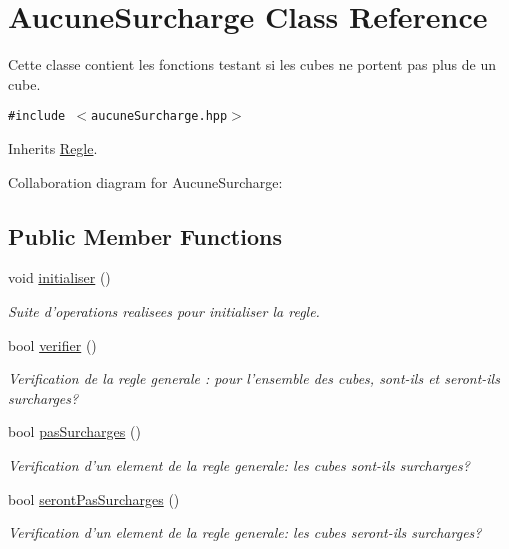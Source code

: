 \hypertarget{classAucuneSurcharge}{
\section{AucuneSurcharge Class Reference}
\label{classAucuneSurcharge}
}
Cette classe contient les fonctions testant si les cubes ne portent pas plus de un cube.  


{\tt \#include $<$aucuneSurcharge.hpp$>$}

Inherits \hyperlink{classRegle}{Regle}.

Collaboration diagram for AucuneSurcharge:\subsection*{Public Member Functions}
\begin{CompactItemize}
\item 
\hypertarget{classAucuneSurcharge_691d3e7997769c020f40d708309f0f1d}{
void \hyperlink{classAucuneSurcharge_691d3e7997769c020f40d708309f0f1d}{initialiser} ()}
\label{classAucuneSurcharge_691d3e7997769c020f40d708309f0f1d}

\begin{CompactList}\small\item\em Suite d'operations realisees pour initialiser la regle. \item\end{CompactList}\item 
bool \hyperlink{classAucuneSurcharge_d96084db10b49f9c48f6cb005248f7c4}{verifier} ()
\begin{CompactList}\small\item\em Verification de la regle generale : pour l'ensemble des cubes, sont-ils et seront-ils surcharges? \item\end{CompactList}\item 
bool \hyperlink{classAucuneSurcharge_985f14cd31785475866dc1081a41e2e1}{pasSurcharges} ()
\begin{CompactList}\small\item\em Verification d'un element de la regle generale: les cubes sont-ils surcharges? \item\end{CompactList}\item 
bool \hyperlink{classAucuneSurcharge_a866df9a186c7b922890cf00af2b58e2}{serontPasSurcharges} ()
\begin{CompactList}\small\item\em Verification d'un element de la regle generale: les cubes seront-ils surcharges? \item\end{CompactList}\end{CompactItemize}


